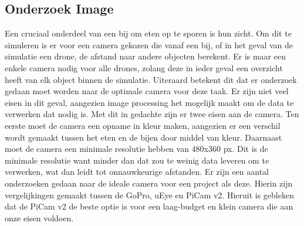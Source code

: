 \subsection{Onderzoek Image}
Een cruciaal onderdeel van een bij om eten op te sporen is hun zicht. Om dit te simuleren is er voor een camera gekozen die vanaf een bij, of in het geval van de simulatie een drone, de afstand naar andere objecten berekent. Er is maar een enkele camera nodig voor alle drones, zolang deze in ieder geval een overzicht heeft van elk object binnen de simulatie.
Uiteraard betekent dit dat er onderzoek gedaan moet worden naar de optimale camera voor deze taak. Er zijn niet veel eisen in dit geval, aangezien image processing het mogelijk maakt om de data te verwerken dat nodig is. Met dit in gedachte zijn er twee eisen aan de camera. Ten eerste moet de camera een opname in kleur maken, aangezien er een verschil wordt gemaakt tussen het eten en de bijen door middel van kleur. Daarnaast moet de camera een minimale resolutie hebben van 480x360 px. Dit is de minimale resolutie want minder dan dat zou te weinig data leveren om te verwerken, wat dan leidt tot onnauwkeurige afstanden.
Er zijn een aantal onderzoeken gedaan naar de ideale camera voor een project als deze. Hierin zijn vergelijkingen gemaakt tussen de GoPro, uEye en PiCam v2. Hieruit is gebleken dat de PiCam v2 de beste optie is voor een laag-budget en klein camera die aan onze eisen voldoen.\cite{picamstudies}

